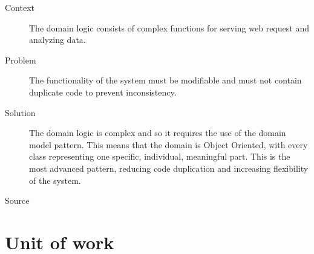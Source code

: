 \begin{description}
\item [Context]
The domain logic consists of complex functions for serving web request and analyzing data.

\item [Problem]
The functionality of the system must be modifiable and must not contain duplicate code to prevent inconsistency.

\item [Solution]
The domain logic is complex and so it requires the use of the domain model pattern. This means that the domain is Object Oriented, with every class representing one specific, individual, meaningful part.
This is the most advanced pattern, reducing code duplication and increasing flexibility of the system.

%

\item [Source]

\end{description}

\section{Unit of work}

